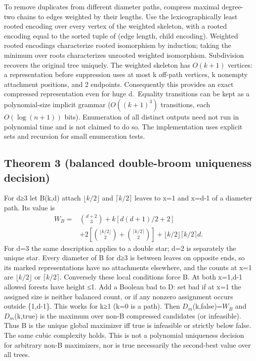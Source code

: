 \documentclass[
  10pt,
  a4paper,
]{article}
\begin{document}
To remove duplicates from different diameter paths, compress maximal
degree-two chains to edges weighted by their lengths. Use the
lexicographically least rooted encoding over every vertex of the
weighted skeleton, with a rooted encoding equal to the sorted tuple of
(edge length, child encoding). Weighted rooted encodings characterize
rooted isomorphism by induction; taking the minimum over roots
characterizes unrooted weighted isomorphism. Subdivision recovers the
original tree uniquely. The weighted skeleton has \(O(k+1)\) vertices: a
representation before suppression uses at most k off-path vertices, k
nonempty attachment positions, and 2 endpoints. Consequently this
provides an exact compressed representation even for huge d.~Equality
transitions can be kept as a polynomial-size implicit grammar
(\(O((k+1)^3)\) transitions, each \(O(\log(n+1))\) bits). Enumeration of
all distinct outputs need not run in polynomial time and is not claimed
to do so. The implementation uses explicit sets and recursion for small
enumeration tests.

\subsection{Theorem 3 (balanced double-broom uniqueness
decision)}\label{theorem-3-balanced-double-broom-uniqueness-decision}

For d≥3 let B(k,d) attach \(\lfloor k/2\rfloor\) and
\(\lceil k/2\rceil\) leaves to x=1 and x=d-1 of a diameter path. Its
value is
\[\begin{aligned}W_B={}&\binom{d+2}{3}+k[d(d+1)/2+2]\\&+2\left[\binom{\lfloor k/2\rfloor}{2}+\binom{\lceil k/2\rceil}{2}\right]+\lfloor k/2\rfloor\lceil k/2\rceil d.\end{aligned}\]
For d=3 the same description applies to a double star; d=2 is separately
the unique star. Every diameter of B for d≥3 is between leaves on
opposite ends, so its marked representations have no attachments
elsewhere, and the counts at x=1 are \(\lfloor k/2\rfloor\) or
\(\lceil k/2\rceil\). Conversely these local conditions force B. At both
x=1,d-1 allowed forests have height ≤1. Add a Boolean bad to D: set bad
if at x=1 the assigned size is neither balanced count, or if any nonzero
assignment occurs outside \{1,d-1\}. This works for k≥1 (k=0 is a path).
Then \(D_m\)(k,false)=\(W_B\) and \(D_m\)(k,true) is the maximum over
non-B compressed candidates (or infeasible). Thus B is the unique global
maximizer iff true is infeasible or strictly below false. The same cubic
complexity holds. This is not a polynomial uniqueness decision for
arbitrary non-B maximizers, nor is true necessarily the second-best
value over all trees.
\end{document}

